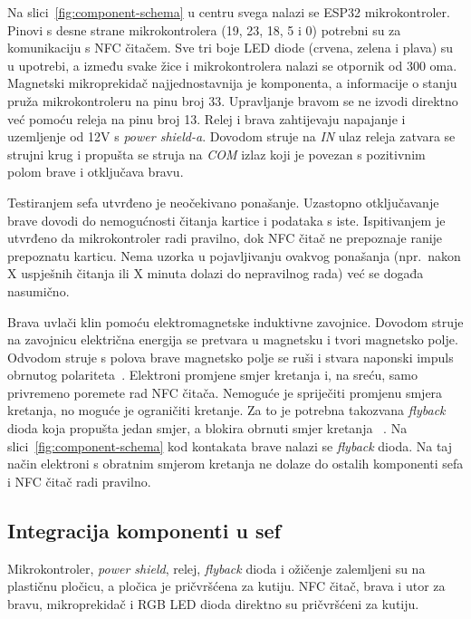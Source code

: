 \pagebreak

Na slici~\ref{fig:component-schema} u centru svega nalazi se ESP32 mikrokontroler.
Pinovi s desne strane mikrokontrolera (19, 23, 18, 5 i 0) potrebni su za komunikaciju s NFC čitačem.
Sve tri boje LED diode (crvena, zelena i plava) su u upotrebi, a između svake žice i mikrokontrolera nalazi se
otpornik od 300 oma.
Magnetski mikroprekidač najjednostavnija je komponenta, a informacije o stanju pruža mikrokontroleru na pinu broj 33.
Upravljanje bravom se ne izvodi direktno već pomoću releja na pinu broj 13.
Relej i brava zahtijevaju napajanje i uzemljenje od 12V s \textit{power shield-a}.
Dovodom struje na \textit{IN} ulaz releja zatvara se strujni krug i propušta se struja na \textit{COM} izlaz koji je
povezan s pozitivnim polom brave i otključava bravu.

Testiranjem sefa utvrđeno je neočekivano ponašanje.
Uzastopno otključavanje brave dovodi do nemogućnosti čitanja kartice i podataka s iste.
Ispitivanjem je utvrđeno da mikrokontroler radi pravilno, dok NFC čitač ne prepoznaje ranije prepoznatu karticu.
Nema uzorka u pojavljivanju ovakvog ponašanja (npr.\ nakon X uspješnih čitanja ili X minuta dolazi do nepravilnog rada)
već se događa nasumično.

Brava uvlači klin pomoću elektromagnetske induktivne zavojnice.
Dovodom struje na zavojnicu električna energija se pretvara u magnetsku i tvori magnetsko polje.
Odvodom struje s polova brave magnetsko polje se ruši i stvara naponski impuls obrnutog polariteta~\cite{flyback-diode}.
Elektroni promjene smjer kretanja i, na sreću, samo privremeno poremete rad NFC čitača.
Nemoguće je spriječiti promjenu smjera kretanja, no moguće je ograničiti kretanje.
Za to je potrebna takozvana \textit{flyback} dioda koja propušta jedan smjer, a blokira obrnuti smjer kretanja
~\cite{flyback-diode}.
Na slici~\ref{fig:component-schema} kod kontakata brave nalazi se \textit{flyback} dioda.
Na taj način elektroni s obratnim smjerom kretanja ne dolaze do ostalih komponenti sefa i NFC čitač radi pravilno.

\pagebreak

\subsection{Integracija komponenti u sef}

Mikrokontroler, \textit{power shield}, relej, \textit{flyback} dioda i ožičenje zalemljeni su na plastičnu pločicu,
a pločica je pričvršćena za kutiju.
NFC čitač, brava i utor za bravu, mikroprekidač i RGB LED dioda direktno su pričvršćeni za kutiju.

